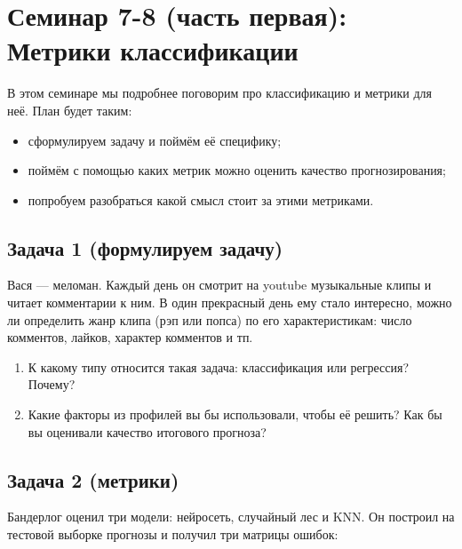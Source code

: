 \documentclass[12pt, a4paper, oneside]{article}
\begin{document}
\section*{Семинар 7-8 (часть первая):  Метрики классификации}

В этом семинаре мы подробнее поговорим про классификацию и метрики для неё. План будет таким: 

\begin{itemize}
	\item сформулируем задачу и поймём её специфику;
	\item поймём с помощью каких метрик можно оценить качество прогнозирования;
	\item попробуем разобраться какой смысл стоит за этими метриками.
\end{itemize}



\subsection*{Задача 1 (формулируем задачу)}

Вася --- меломан. Каждый день он смотрит на youtube музыкальные клипы и читает комментарии к ним. В один прекрасный день ему стало интересно, можно ли определить жанр клипа (рэп или попса) по его характеристикам: число комментов, лайков, характер комментов и тп. 

\begin{enumerate}
	\item К какому типу относится такая задача: классификация или регрессия? Почему? 
	
	\item Какие факторы из профилей вы бы использовали, чтобы её решить? Как бы вы оценивали качество итогового прогноза?
\end{enumerate}


\subsection*{Задача 2 (метрики)}

Бандерлог оценил три модели: нейросеть, случайный лес и KNN.  Он построил на тестовой выборке прогнозы и получил три матрицы ошибок: 
\end{document}
